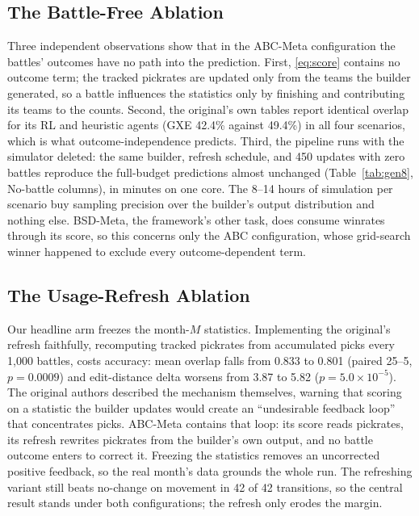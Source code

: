 \documentclass[journal]{IEEEtran}
\begin{document}
\subsection{The Battle-Free Ablation}
\label{sec:battlefree}

Three independent observations show that in the ABC-Meta configuration the
battles' outcomes have no path into the prediction. First,
\eqref{eq:score} contains no outcome term; the tracked pickrates are
updated only from the teams the builder generated, so a battle influences
the statistics only by finishing and contributing its teams to the
counts. Second, the original's own tables report identical overlap for its
RL and heuristic agents (GXE 42.4\% against 49.4\%) in all four scenarios,
which is what outcome-independence predicts. Third, the pipeline runs with
the simulator deleted: the same builder, refresh schedule, and 450 updates
with zero battles reproduce the full-budget predictions almost unchanged
(Table~\ref{tab:gen8}, No-battle columns), in minutes on one core. The
8--14 hours of simulation per scenario buy sampling precision over the
builder's output distribution and nothing else. BSD-Meta, the framework's
other task, does consume winrates through its score, so this concerns only
the ABC configuration, whose grid-search winner happened to exclude every
outcome-dependent term.

\subsection{The Usage-Refresh Ablation}
\label{sec:refresh}

Our headline arm freezes the month-$M$ statistics. Implementing the
original's refresh faithfully, recomputing tracked pickrates from
accumulated picks every 1{,}000 battles, costs accuracy: mean overlap
falls from 0.833 to 0.801 (paired 25--5, $p=0.0009$) and edit-distance
delta worsens from 3.87 to 5.82 ($p=5.0\times10^{-5}$). The original
authors described the mechanism themselves, warning that scoring on a
statistic the builder updates would create an ``undesirable feedback
loop''~\cite{saravanan2024framework} that concentrates picks. ABC-Meta
contains that loop: its score reads pickrates, its refresh rewrites
pickrates from the builder's own output, and no battle outcome enters to
correct it. Freezing the statistics removes an uncorrected positive
feedback, so the real month's data grounds the whole run. The refreshing
variant still beats no-change on movement in 42 of 42 transitions, so
the central result stands under both configurations; the refresh only
erodes the margin.
\end{document}
